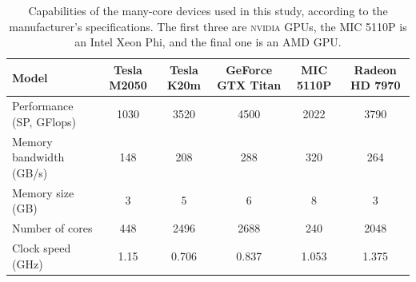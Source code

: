 \documentclass[journal]{IEEEtran}
\begin{document}
\begin{table}[tbp]
  \caption{Capabilities of the many-core devices used in this study,
    according to the manufacturer's specifications. The first three
    are \textsc{nvidia} GPUs, the MIC 5110P is an Intel Xeon Phi, and the final one is an AMD GPU.}
  \label{tab_hwspecs}
  \centering
  \begin{tabular}{|l|c|c|c|c|c|}
    \hline
    Model & Tesla M2050 & Tesla K20m & GeForce GTX  Titan & MIC 5110P & Radeon HD 7970 \\
    \hline
    \hline
    Performance (SP, GFlops) & 1030 & 3520 & 4500 & 2022 & 3790\\
    Memory bandwidth  (GB/s) & 148 & 208 & 288  & 320 & 264\\   
    Memory size (GB) & 3 & 5 & 6 & 8 & 3\\
    Number of cores & 448 & 2496 & 2688 & 240 & 2048\\
    Clock speed (GHz) & 1.15 & 0.706 & 0.837 & 1.053 & 1.375\\
    \hline
  \end{tabular}
\end{table}
\end{document}
